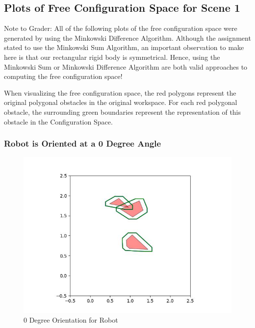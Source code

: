 \documentclass{article}
\begin{document}
\subsection{Plots of Free Configuration Space for Scene 1}
Note to Grader: All of the following plots of the free configuration space were generated by using the Minkowski Difference Algorithm. Although the assignment stated to use the Minkowski Sum Algorithm, an important observation to make here is that our rectangular rigid body is symmetrical. Hence, using the Minkowski Sum or Minkowski Difference Algorithm are both valid approaches to computing the free configuration space! \newline 

When visualizing the free configuration space, the red polygons represent the original polygonal obstacles in the original workspace. For each red polygonal obstacle, the surrounding green boundaries represent the representation of this obstacle in the Configuration Space. 


\subsubsection{Robot is Oriented at a 0 Degree Angle}
\begin{figure}[h!]
	\includegraphics[width= 0.9 \linewidth]{Problem3_minkowski1_0.jpg}
	\centering
	\caption{0 Degree Orientation for Robot}
	\label{Problem3_minkowski1_0.jpg}
\end{figure}

\newpage
\end{document}
